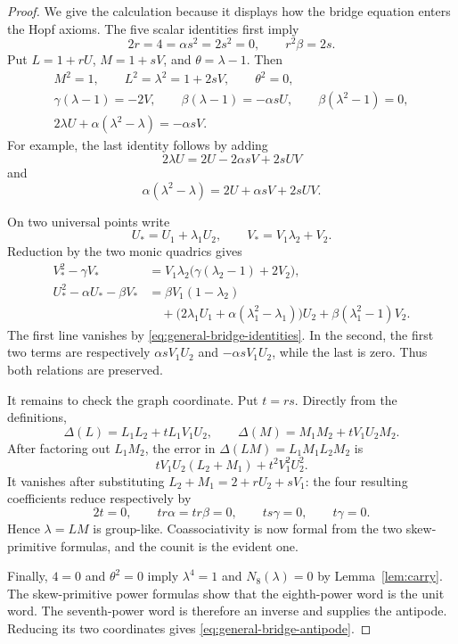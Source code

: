 \documentclass[11pt]{amsart}
\theoremstyle{definition}
\theoremstyle{remark}
\begin{document}
\begin{proof}
We give the calculation because it displays how the bridge equation enters
the Hopf axioms.  The five scalar identities first imply
\[
 2r=4=\alpha s^2=2s^2=0,
 \qquad
 r^2\beta=2s.
\]
Put \(L=1+rU\), \(M=1+sV\), and \(\theta=\lambda-1\).  Then
\begin{equation}\label{eq:general-bridge-identities}
 \begin{gathered}
  M^2=1,\qquad L^2=\lambda^2=1+2sV,\qquad \theta^2=0,\\
  \gamma(\lambda-1)=-2V,\qquad
  \beta(\lambda-1)=-\alpha sU,\qquad
  \beta(\lambda^2-1)=0,\\
  2\lambda U+\alpha(\lambda^2-\lambda)=-\alpha sV.
 \end{gathered}
\end{equation}
For example, the last identity follows by adding
\[
 2\lambda U=2U-2\alpha sV+2sUV
\]
and
\[
 \alpha(\lambda^2-\lambda)=2U+\alpha sV+2sUV.
\]

On two universal points write
\[
 U_*=U_1+\lambda_1U_2,\qquad
 V_*=V_1\lambda_2+V_2.
\]
Reduction by the two monic quadrics gives
\begin{align*}
 V_*^2-\gamma V_*
 &=V_1\lambda_2
   \bigl(\gamma(\lambda_2-1)+2V_2\bigr),\\
 U_*^2-\alpha U_*-\beta V_*
 &=\beta V_1(1-\lambda_2)\\
 &\quad+
 \bigl(2\lambda_1U_1+\alpha(\lambda_1^2-\lambda_1)\bigr)U_2
 +\beta(\lambda_1^2-1)V_2.
\end{align*}
The first line vanishes by \eqref{eq:general-bridge-identities}.  In the
second, the first two terms are respectively
\(\alpha sV_1U_2\) and \(-\alpha sV_1U_2\), while the last is zero.
Thus both relations are preserved.

It remains to check the graph coordinate.  Put \(t=rs\).  Directly from
the definitions,
\[
 \Delta(L)=L_1L_2+tL_1V_1U_2,\qquad
 \Delta(M)=M_1M_2+tV_1U_2M_2.
\]
After factoring out \(L_1M_2\), the error in
\(\Delta(LM)=L_1M_1L_2M_2\) is
\[
 tV_1U_2(L_2+M_1)+t^2V_1^2U_2^2.
\]
It vanishes after substituting \(L_2+M_1=2+rU_2+sV_1\):
the four resulting coefficients reduce respectively by
\[
 2t=0,\qquad tr\alpha=tr\beta=0,\qquad ts\gamma=0,
 \qquad t\gamma=0.
\]
Hence \(\lambda=LM\) is group-like.  Coassociativity is now formal from
the two skew-primitive formulas, and the counit is the evident one.

Finally, \(4=0\) and \(\theta^2=0\) imply
\(\lambda^4=1\) and \(N_8(\lambda)=0\) by
Lemma~\ref{lem:carry}.  The skew-primitive power formulas show that the
eighth-power word is the unit word.  The seventh-power word is therefore
an inverse and supplies the antipode.  Reducing its two coordinates gives
\eqref{eq:general-bridge-antipode}.
\end{proof}
\end{document}
